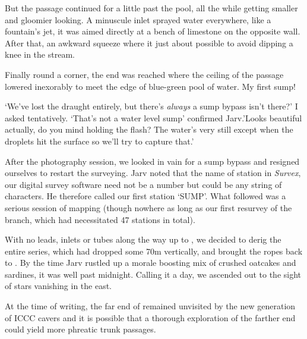 But the passage continued for a little past the pool, all the while getting smaller and gloomier looking. A minuscule inlet sprayed water everywhere, like a fountain’s jet, it was aimed directly at a bench of limestone on the opposite wall. After that, an awkward squeeze where it just about possible to avoid dipping a knee in the stream. 

Finally round a corner, the end was reached where the ceiling of the passage lowered inexorably to meet the edge of blue-green pool of water. My first sump!

‘We’ve lost the draught entirely, but there’s \emph{always} a sump bypass isn’t there?’ I asked tentatively.
‘That’s not a water level sump’ confirmed Jarv.’Looks beautiful actually, do you mind holding the flash? The water’s very still except when the droplets hit the surface so we’ll try to capture that.’

After the photography session, we looked in vain for a sump bypass and resigned ourselves to restart the surveying. Jarv noted that the name of station in \emph{Survex}, our digital survey software need not be a number but could be any string of characters. He therefore called our first station ‘SUMP’. What followed was a serious session of mapping (though nowhere as long as our first resurvey of the  branch, which had necessitated 47 stations in total). 

With no leads, inlets or tubes along the way up to , we decided to derig the entire series, which had dropped some 70m vertically, and brought the ropes back to . By the time Jarv rustled up a morale boosting mix of crushed oatcakes and sardines, it was well past midnight. Calling it a day, we ascended out to the sight of stars vanishing in the east. 

At the time of writing, the far end of  remained unvisited by the new generation of ICCC cavers and it is possible that a thorough exploration of the farther end could yield more phreatic trunk passages.

